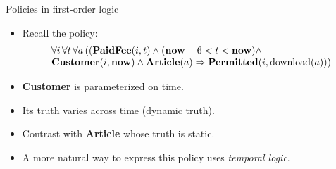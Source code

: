 \documentclass[style=sailor,size=12pt]{powerdot}
\newcommand{\rid}[1]{\mbox{\rm #1}}
\newcommand{\bid}[1]{\mbox{\bf #1}}
\theoremstyle{definition}
\begin{document}
\begin{wideslide}[bm=,toc=]{Policies in first-order logic}
\begin{itemize}
\item Recall the policy:
\begin{displaymath}
\begin{array}{l}
\forall i\, \forall t\, \forall a\, ((\bid{PaidFee}(i,t)\wedge (\bid{now} - 6 < t < \bid{now})\wedge \\
\bid{Customer}(i,\bid{now})\wedge\bid{Article}(a) \Rightarrow \bid{Permitted}(i,\rid{download}(a)))
\end{array}
\end{displaymath}
\item {\bf Customer} is parameterized on time.
\item Its truth varies across time (dynamic truth).
\item Contrast with {\bf Article} whose truth is static.
\item A more natural way to express this policy uses {\em temporal logic\/}.
\end{itemize}
\end{wideslide}
\end{document}
